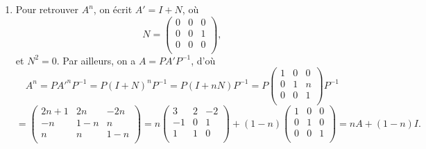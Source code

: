 {{\begin {enumerate}
\begin {enumerate}
$$A'=\begin{pmatrix}1&0&0 \\  0&1&1 \\ 0&0&1 \\ \end{pmatrix}.$$
La matrice de passage $P$ est \'egale \`a 
$$P=\begin{pmatrix}0&2&1 \\  1&-1&0 \\ 1&1&0 \\ \end{pmatrix}$$ et son inverse
$$P^{-1}=\begin{pmatrix}0&1/2&1/2 \\  0&-1/2&1/2 \\ 1&1&-1 \\ \end{pmatrix}.$$
    \item Pour retrouver $A^n$, on \'ecrit $A'=I+N$, o\`u
$$N=\begin{pmatrix}0&0&0 \\  0&0&1 \\ 0&0&0 \\ \end{pmatrix},$$
et $N^2=0$. Par ailleurs, on a $A=PA'P^{-1}$, d'o\`u 
$$A^n=PA'^nP^{-1}=P(I+N)^nP^{-1}=P(I+nN)P^{-1}=P\begin{pmatrix}1&0&0 \\  0&1&n \\ 0&0&1 \\ \end{pmatrix}P^{-1}$$
$$=\begin{pmatrix}2n+1&2n&-2n \\  -n&1-n&n \\  n&n&1-n \\ \end{pmatrix}=n\begin{pmatrix}3&2&-2 \\  -1&0&1 \\ 1&1&0 \\ \end{pmatrix}+(1-n)\begin{pmatrix}1&0&0 \\  0&1&0 \\ 0&0&1 \\ \end{pmatrix}=nA+(1-n)I.$$    
  \end {enumerate}
\end {enumerate}
}
}
